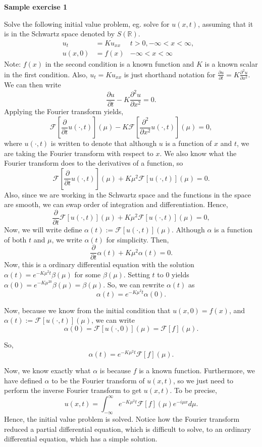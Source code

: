 \textbf{Sample exercise 1}

Solve the following initial value problem, eg. solve for $u(x,t)$, assuming that it is in the Schwartz space denoted by $S(\mathbb{R})$.
\begin{align*}
u_t &= Ku_{xx} &t>0, -\infty < x < \infty,&\\
u(x,0) &= f(x) &-\infty < x < \infty&
\end{align*}
Note: $f(x)$ in the second condition is a known function and $K$ is a known scalar in the first condition. Also, $u_t = Ku_{xx}$ is just shorthand notation for $\frac{\partial u}{\partial t} = K\frac{\partial^2 u}{\partial x^2}$.
We can then write
$$\frac{\partial u}{\partial t} - K\frac{\partial^2 u}{\partial x^2} = 0.$$
Applying the Fourier transform yields,
$$\mathcal{F}\left[\frac{\partial}{\partial t} u(\cdot,t)\right](\mu) - K \mathcal{F}\left[\frac{\partial^2}{\partial x^2} u(\cdot,t) \right](\mu) = 0,$$
where $u(\cdot,t)$ is written to denote that although $u$ is a function of $x$ and $t$, we are taking the Fourier transform with respect to $x$. We also know what the Fourier transform does to the derivatives of a function, so
$$\mathcal{F}\left[\frac{\partial}{\partial t} u(\cdot,t)\right](\mu) + K\mu^2 \mathcal{F}\left[ u(\cdot,t) \right](\mu) = 0.$$	
Also, since we are working in the Schwartz space and the functions in the space are smooth, we can swap order of integration and differentiation. 
Hence,
$$\frac{\partial}{\partial t}\mathcal{F}\left[u(\cdot,t)\right](\mu) + K\mu^2 \mathcal{F}\left[ u(\cdot,t) \right](\mu) = 0,$$
Now, we will write define $\alpha(t) := \mathcal{F}\left[u(\cdot,t)\right](\mu)$. Although $\alpha$ is a function of both $t$ and $\mu$, we write $\alpha(t)$ for simplicity. Then,
$$\frac{\partial}{\partial t}\alpha(t) + K\mu^2 \alpha(t) = 0.$$
Now, this is a ordinary differential equation with the solution $\alpha(t) = e^{-K\mu^2t}\beta(\mu)$ for some $\beta(\mu)$. Setting $t$ to 0 yields
$\alpha(0) = e^{-K\mu^20}\beta(\mu) = \beta(\mu)$. So, we can rewrite $\alpha(t)$ as
$$\alpha(t) = e^{-K\mu^2t}\alpha(0).$$

Now, because we know from the initial condition that $u(x,0) = f(x)$, and $\alpha(t) := \mathcal{F}\left[u(\cdot,t)\right](\mu)$, we can write
$$\alpha(0) = \mathcal{F}\left[u(\cdot,0)\right](\mu)=\mathcal{F}\left[f\right](\mu).$$

So, $$\alpha(t) = e^{-K\mu^2t}\mathcal{F}\left[f\right](\mu).$$

Now, we know exactly what $\alpha$ is because $f$ is a known function. Furthermore, we have defined $\alpha$ to be the Fourier transform of $u(x,t)$, so we just need to perform the inverse Fourier transform to get $u(x,t)$. To be precise,
$$u(x,t) = \int_{-\infty}^{\infty}e^{-K\mu^2t}\mathcal{F}\left[f\right](\mu) e^{-i\mu x} d\mu.$$
Hence, the initial value problem is solved. Notice how the Fourier transform reduced a partial differential equation, which is difficult to solve, to an ordinary differential equation, which has a simple solution.

